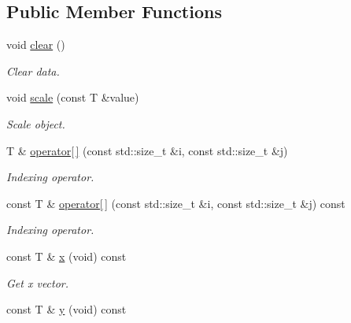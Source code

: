 \subsection*{Public Member Functions}
\begin{DoxyCompactItemize}
\item 
\mbox{\label{classddd_1_1mat_object_ad7c6aab0d8d7f5a2b6c522175aa35fc0}} 
void \hyperlink{classddd_1_1mat_object_ad7c6aab0d8d7f5a2b6c522175aa35fc0}{clear} ()
\begin{DoxyCompactList}\small\item\em Clear data. \end{DoxyCompactList}\item 
void \hyperlink{classddd_1_1mat_object_a078f66a56b01fc18cc9864ec736611e5}{scale} (const T \&value)
\begin{DoxyCompactList}\small\item\em Scale object. \end{DoxyCompactList}\item 
T \& \hyperlink{classddd_1_1mat_object_a361b78105da1bb2151f51f674a20d59a}{operator\mbox{[}$\,$\mbox{]}} (const std\+::size\+\_\+t \&i, const std\+::size\+\_\+t \&j)
\begin{DoxyCompactList}\small\item\em Indexing operator. \end{DoxyCompactList}\item 
const T \& \hyperlink{classddd_1_1mat_object_ae87764e4910b1323233f611c796946a2}{operator\mbox{[}$\,$\mbox{]}} (const std\+::size\+\_\+t \&i, const std\+::size\+\_\+t \&j) const
\begin{DoxyCompactList}\small\item\em Indexing operator. \end{DoxyCompactList}\item 
\mbox{\label{classddd_1_1mat_object_ae5d6d780c693c989836db506094a04b1}} 
const T \& \hyperlink{classddd_1_1mat_object_ae5d6d780c693c989836db506094a04b1}{x} (void) const
\begin{DoxyCompactList}\small\item\em Get x vector. \end{DoxyCompactList}\item 
\mbox{\label{classddd_1_1mat_object_a7122d95c42d387eed62a3d821061a97f}} 
const T \& \hyperlink{classddd_1_1mat_object_a7122d95c42d387eed62a3d821061a97f}{y} (void) const

\end{DoxyCompactItemize}
